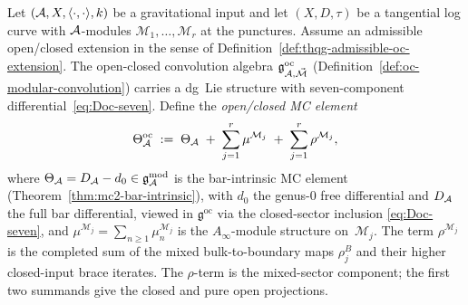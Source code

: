 \begin{construction}
\label{constr:thqg-oc-mc-element}
Let $(\mathcal{A}, X, \langle \cdot, \cdot \rangle, k)$ be a gravitational
input and let $(X, D, \tau)$ be a tangential log curve with
$\mathcal{A}$-modules $\mathcal{M}_1, \ldots, \mathcal{M}_r$ at the
punctures. Assume an admissible open/closed extension in the sense of
Definition~\ref{def:thqg-admissible-oc-extension}.
The open-closed convolution algebra
$\mathfrak{g}^{\mathrm{oc}}_{\mathcal{A}, \vec{\mathcal{M}}}$
(Definition~\ref{def:oc-modular-convolution}) carries a dg~Lie
structure with seven-component differential~\eqref{eq:Doc-seven}.
Define the \emph{open/closed MC element}
\begin{equation}\label{eq:thqg-oc-mc}
\Theta^{\mathrm{oc}}_{\mathcal{A}}
\;:=\;
\Theta_{\mathcal{A}}
\;+\;
\sum_{j=1}^{r}
\mu^{\mathcal{M}_j}
\;+\;
\sum_{j=1}^{r}
\rho^{\mathcal{M}_j},
\end{equation}
where $\Theta_{\mathcal{A}} = D_{\mathcal{A}} - d_0 \in \mathfrak{g}_{\mathcal{A}}^{\mathrm{mod}}$ is the bar-intrinsic
MC element (Theorem~\ref{thm:mc2-bar-intrinsic}), with $d_0$ the
genus-$0$ free differential and $D_{\mathcal{A}}$ the full bar differential,
viewed in
$\mathfrak{g}^{\mathrm{oc}}$ via the closed-sector inclusion
\eqref{eq:Doc-seven}, and
$\mu^{\mathcal{M}_j} = \sum_{n \ge 1} \mu_n^{\mathcal{M}_j}$ is the
$A_\infty$-module structure on~$\mathcal{M}_j$. The term
$\rho^{\mathcal{M}_j}$ is the completed sum of the mixed
bulk-to-boundary maps $\rho_j^B$ and their higher closed-input brace
iterates. The $\rho$-term is the mixed-sector component; the first two
summands give the closed and pure open projections.
\end{construction}

